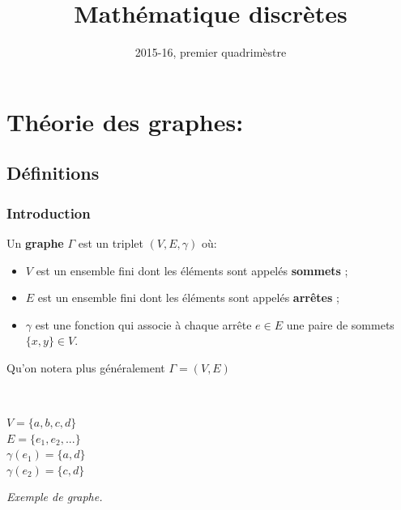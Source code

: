 \documentclass[11pt]{article}
\title{Mathématique discrètes}
\date{2015-16, premier quadrimèstre}
\author{}
\begin{document}
\maketitle
\tableofcontents
\pagebreak
\clearpage
\setcounter{page}{1}

\section{Théorie des graphes:}
	\subsection{Définitions} 
		\subsubsection{Introduction}
	
			Un \textbf{graphe} $\Gamma$ est un triplet $(V,E,\gamma)$ où:
			\begin{itemize}
				\item $V$ est un ensemble fini dont les éléments sont appelés \textbf{sommets} ;
				\item $E$ est un ensemble fini dont les éléments sont appelés \textbf{arrêtes} ;
				\item $\gamma$ est une fonction qui associe à chaque arrête $e \in E$ une paire de sommets $\{x,y\} \in V$.
			\end{itemize}
			Qu'on notera plus généralement $\Gamma=(V,E)$
			
			\begin{minipage}{0.5\textwidth}
			\center  
			 \\
			\end{minipage}\hfill
			\begin{minipage}{0.5\textwidth}
			\center
			$V = \{a,b,c,d\}$ \\
			$E = \{e_1, e_2, ...\}$ \\
			$\gamma(e_1)=\{a,d\}$ \\
			$\gamma(e_2)=\{c,d\}$\\
			\end{minipage}
			\begin{center}
			\textit{Exemple de graphe.} \\
			\end{center}
\end{document}
